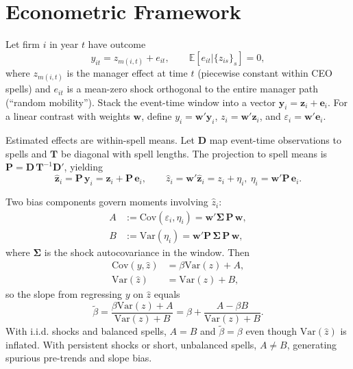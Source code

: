 \documentclass[11pt,a4paper]{article}
\newcommand{\Var}{\text{Var}}
\newcommand{\Cov}{\text{Cov}}
\begin{document}
\section{Econometric Framework}

Let firm $i$ in year $t$ have outcome
\begin{equation}\label{eq:model1}
  y_{it} = z_{m(i,t)} + e_{it},\qquad \mathbb E[e_{it}|\{z_{is}\}_s]=0,
\end{equation}
where $z_{m(i,t)}$ is the manager effect at time $t$ (piecewise constant within CEO spells) and $e_{it}$ is a mean-zero shock orthogonal to the entire manager path (“random mobility”). Stack the event-time window into a vector $\mathbf y_i=\mathbf z_i+\mathbf e_i$. For a linear contrast with weights $\mathbf w$, define $y_i=\mathbf w'\mathbf y_i$, $z_i=\mathbf w'\mathbf z_i$, and $\varepsilon_i=\mathbf w'\mathbf e_i$.

Estimated effects are within-spell means. Let $\mathbf D$ map event-time observations to spells and $\mathbf T$ be diagonal with spell lengths. The projection to spell means is $\mathbf P=\mathbf D\,\mathbf T^{-1}\mathbf D'$, yielding
\begin{equation}
 \hat{\mathbf z}_i = \mathbf P\,\mathbf y_i = \mathbf z_i + \mathbf P\,\mathbf e_i,\qquad \hat z_i=\mathbf w'\hat{\mathbf z}_i = z_i + \eta_i,\ \eta_i=\mathbf w'\mathbf P\,\mathbf e_i.
\end{equation}

Two bias components govern moments involving $\hat z_i$:
\begin{align}
 A &:= \Cov(\varepsilon_i,\eta_i) = \mathbf w'\boldsymbol\Sigma\,\mathbf P\,\mathbf w,\\
 B &:= \Var(\eta_i) = \mathbf w'\mathbf P\,\boldsymbol\Sigma\,\mathbf P\,\mathbf w,
\end{align}
where $\boldsymbol\Sigma$ is the shock autocovariance in the window. Then
\begin{align}
 \Cov(y,\hat z) &= \beta\Var(z) + A,\\
 \Var(\hat z) &= \Var(z) + B,
\end{align}
so the slope from regressing $y$ on $\hat z$ equals
\begin{equation}
 \tilde\beta = \frac{\beta\Var(z)+A}{\Var(z)+B} = \beta + \frac{A-\beta B}{\Var(z)+B}.
\end{equation}
With i.i.d. shocks and balanced spells, $A=B$ and $\tilde\beta=\beta$ even though $\Var(\hat z)$ is inflated. With persistent shocks or short, unbalanced spells, $A\neq B$, generating spurious pre-trends and slope bias.
\end{document}
